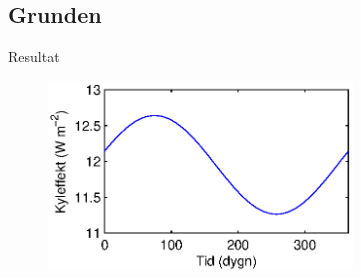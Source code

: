\subsection{Grunden}

\begin{frame}{Resultat}

\begin{figure}[hpbt]
\centering
\includegraphics[height=5cm]{images/foundation.eps}
\caption{}
\end{figure}

\end{frame}